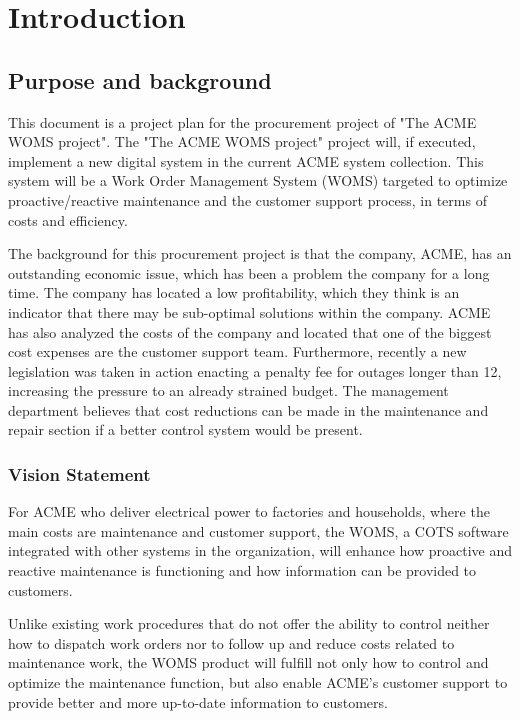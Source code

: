 \section{Introduction}
\label{sec:introduction}
\subsection{Purpose and background}
\label{purpose_and_background}
This document is a project plan for the procurement project of "The ACME WOMS project". The "The ACME WOMS project" project will, if executed, implement a new digital system in the current ACME system collection. This system will be a Work Order Management System (WOMS) targeted to optimize proactive/reactive maintenance and the customer support process, in terms of costs and efficiency.

The background for this procurement project is that the company, ACME, has an outstanding economic issue, which has been a problem the company for a long time. The company has located a low profitability, which they think is an indicator that there may be sub-optimal solutions within the company. ACME has also analyzed the costs of the company and located that one of the biggest cost expenses are the customer support team. Furthermore, recently a new legislation was taken in action enacting a penalty fee for outages longer than 12, increasing the pressure to an already strained budget. The management department believes that cost reductions can be made in the maintenance and repair section if a better control system would be present.\cite{A}

\subsubsection{Vision Statement}
\label{vision_statement}
For ACME who deliver electrical power to factories and households, where the main costs are maintenance and customer support, the WOMS, a COTS software integrated with other systems in the organization, will enhance how proactive and reactive maintenance is functioning and how information can be provided to customers.

Unlike existing work procedures that do not offer the ability to control neither how to dispatch work orders nor to follow up and reduce costs related to maintenance work, the WOMS product will fulfill not only how to control and optimize the maintenance function, but also enable ACME's customer support to provide better and more up-to-date information to customers. 

